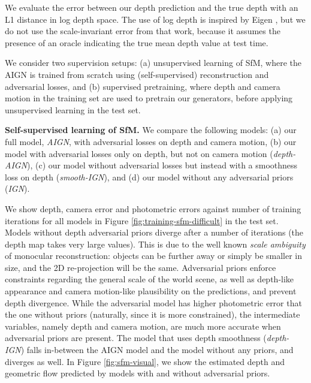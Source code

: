 \documentclass[10pt,twocolumn,letterpaper]{article}
\newcommand\todo[1]{\textcolor{red}{#1}}
\begin{document}
\begin{bibunit}[ieee]
We evaluate the error between our depth prediction and the true depth with an L1 distance in log depth space. The use of log depth is inspired by Eigen \etal\cite{eigen2014depth}, but we do not use the scale-invariant error from that work, because it assumes the presence of an oracle indicating the true mean depth value at test time. 

We consider two supervision setups: (a) unsupervised learning of SfM, where the AIGN is trained from scratch using  (self-supervised) reconstruction and adversarial losses, and (b) supervised pretraining,  where depth and camera motion in the training set are used to pretrain our generators, before applying unsupervised learning in the test set.

\textbf{Self-supervised learning of SfM.}%
We compare  the following models: (a) our full model, \textit{AIGN}, with adversarial losses on depth and camera motion, (b) our model with adversarial losses only on depth, but not on camera motion (\textit{depth-AIGN}), (c) our model without adversarial losses but instead with a smoothness loss on depth (\textit{smooth-IGN}), and (d) our model without any adversarial priors (\textit{IGN}). 


We show depth, camera error and photometric errors against number of training iterations for all models in Figure \ref{fig:training-sfm-difficult} in the test set.  Models without depth adversarial priors diverge after a number of iterations (the depth map takes very large values).  This is due to the well known \textit{scale ambiguity} of monocular reconstruction: objects can be further away or simply be smaller in size, and the 2D re-projection will be the same. Adversarial priors enforce constraints regarding the general scale of the world scene, as well as depth-like appearance and camera motion-like plausibility on the predictions, and prevent depth divergence. While the adversarial model has higher  photometric error that the one without priors (naturally, since it is more constrained), the intermediate variables, namely depth and camera motion, are much more accurate when adversarial priors are present. The model that uses depth smoothness (\textit{depth-IGN}) falls in-between the AIGN model and the model without any priors, and diverges as well. In Figure \ref{fig:sfm-visual}, we show the estimated depth and geometric flow predicted by models with and without adversarial priors.


\end{bibunit}
\end{document}
